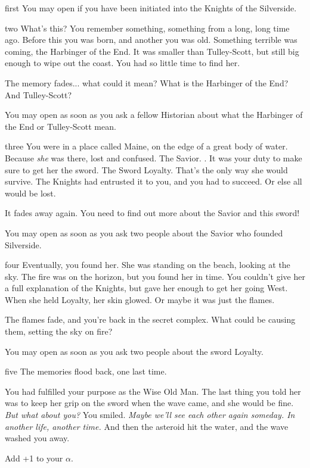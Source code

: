 \documentclass[greennotebook]{Silversiders} %
\begin{document}
\startnotebook{\nWisdomGreenTwo{}}

\begin{page}{first}
You may open  if you have been initiated into the Knights of the Silverside.
\end{page}

\begin{page}{two}
What's this? You remember something, something from a long, long time ago. Before this you was born, and another you was old. Something terrible was coming, the Harbinger of the End. It was smaller than Tulley-Scott, but still big enough to wipe out the coast. You had so little time to find her.

The memory fades... what could it mean? What is the Harbinger of the End? And Tulley-Scott?

You may open  as soon as you ask a fellow Historian about what the Harbinger of the End or Tulley-Scott mean.
\end{page}

\begin{page}{three}
You were in a place called Maine, on the edge of a great body of water. Because \emph{she} was there, lost and confused. The Savior. \cSavior{\intro}. It was your duty to make sure to get her the sword. The Sword Loyalty. That's the only way she would survive. The Knights had entrusted it to you, and you had to succeed. Or else all would be lost.

It fades away again. You need to find out more about the Savior and this sword!

You may open  as soon as you ask two people about the Savior who founded Silverside.
\end{page}

\begin{page}{four}
Eventually, you found her. She was standing on the beach, looking at the sky. The fire was on the horizon, but you found her in time. You couldn't give her a full explanation of the Knights, but gave her enough to get her going West. When she held Loyalty, her skin glowed. Or maybe it was just the flames.

The flames fade, and you're back in the secret complex. What could be causing them, setting the sky on fire?

You may open  as soon as you ask two people about the sword Loyalty.
\end{page}

\begin{page}{five}
The memories flood back, one last time.

You had fulfilled your purpose as the Wise Old Man. The last thing you told her was to keep her grip on the sword when the wave came, and she would be fine. \emph{But what about you?} You smiled. \emph{Maybe we'll see each other again someday. In another life, another time.} And then the asteroid hit the water, and the wave washed you away.

Add +1 to your $\alpha$.
\end{page}

\endnotebook
\end{document}

